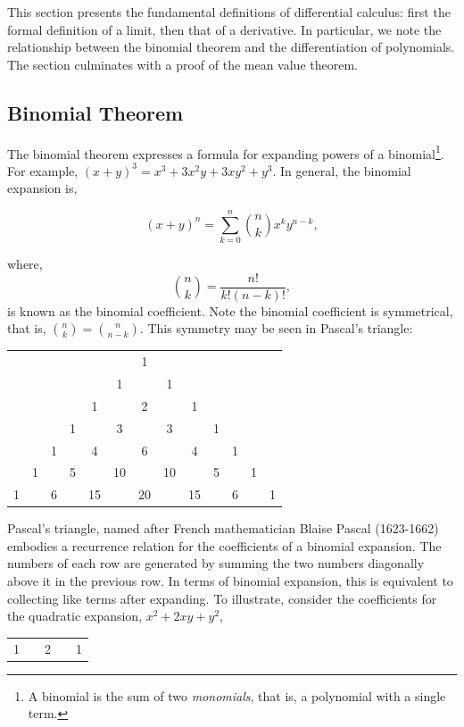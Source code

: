 \documentclass[11pt]{amsart}
\begin{document}
This section presents the fundamental definitions of differential calculus: first the formal definition of a limit, then that of a derivative. In particular, we note the relationship between the binomial theorem and the differentiation of polynomials. The section culminates with a proof of the mean value theorem.

\subsection{Binomial Theorem}

The binomial theorem expresses a formula for expanding powers of a binomial\footnote{A binomial is the sum of two \emph{monomials}, that is, a polynomial with a single term.}. For example, $(x + y)^3 = x^3 + 3x^2y + 3xy^2 + y^3$. In general, the binomial expansion is,

$$(x + y)^n = \sum_{k = 0}^{n}{{n}\choose{k}}x^ky^{n-k},$$

where, $${{n}\choose{k}} = \frac{n!}{k!(n-k)!},$$ is known as the binomial coefficient. Note the binomial coefficient is symmetrical, that is, ${{n}\choose{k}} = {{n}\choose{n-k}}$. This symmetry may be seen in Pascal's triangle:

\begin{center}
\begin{tabular}{ccccccccccccc}
&&&&&&1&&&&&& \\
&&&&&1&&1&&&&& \\
&&&&1&&2&&1&&&& \\
&&&1&&3&&3&&1&&& \\
&&1&&4&&6&&4&&1&& \\
&1&&5&&10&&10&&5&&1& \\
1&&6&&15&&20&&15&&6&&1 \\
\end{tabular}
\end{center}

Pascal's triangle, named after French mathematician Blaise Pascal (1623-1662) embodies a recurrence relation for the coefficients of a binomial expansion. The numbers of each row are generated by summing the two numbers diagonally above it in the previous row. In terms of binomial expansion, this is equivalent to collecting like terms after expanding. To illustrate, consider the coefficients for the quadratic expansion, $x^2 + 2xy + y^2$,

\begin{center}
\begin{tabular}{ccccc}
1&&2&&1\\
\end{tabular}
\end{center}
\end{document}
